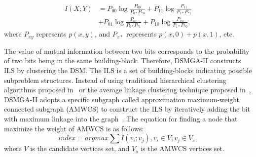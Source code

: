 \begin{equation} 
\begin{split}
I(X;Y) &= P_{00 }\log{\frac{P_{00}}{P_{0*} P_{*0}}} + P_{11 }\log{\frac{P_{11}}{P_{1*} P_{*1}}}  \\
	    &+ P_{01 }\log{\frac{P_{01}}{P_{0*} P_{*1}}} + P_{10 }\log{\frac{P_{10}}{P_{1*} P_{*0}}},  
\end{split}
\end{equation}
where $P_{xy}$ represents $p(x,y)$, and $P_{x*}$ represents $p(x,0)+p(x,1)$, etc.

The value of mutual information between two bits corresponds to the probability of two bits being in the same building-block.
Therefore, DSMGA-II constructs ILS by clustering the DSM.
The ILS is a set of building-blocks indicating possible subproblem structures.
Instead of using traditional hierarchical clustering algorithms proposed in~\cite{thierens:LTGA} or the average linkage clustering technique proposed in~\cite{thierens:OM}, DSMGA-II adopts a specific subgraph called approximation maximum-weight connected subgraph (AMWCS) to construct the ILS by iteratively adding the bit with maximum linkage into the graph~\cite{hsu:DSMGA2}.
The equation for finding a node that maximize the weight of AMWCS is as follows:
\begin{equation} \textit{index} = argmax\sum I(v_i;v_j), {v_i\in V}, {v_j \in V_s},\end{equation}
where $V$ is the candidate vertices set, and $V_s$ is the AMWCS vertices set.




